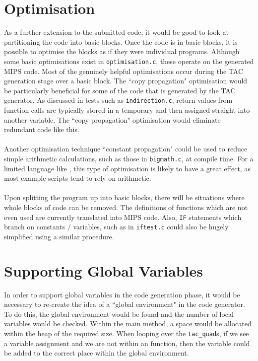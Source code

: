 \section{Optimisation}
As a further extension to the submitted code, it would be good to look at partitioning the code into basic blocks. Once the code is in basic blocks, it is possible to optimise the blocks as if they were individual programs. Although some basic optimisations exist in \verb!optimisation.c!, these operate on the generated MIPS code. Most of the genuinely helpful optimisations occur during the TAC generation stage over a basic block. The ``copy propagation" optimisation would be particularly beneficial for some of the code that is generated by the TAC generator. As discussed in tests such as \verb!indirection.c!, return values from function calls are typically stored in a temporary and then assigned straight into another variable. The ``copy propagation" optimisation would eliminate redundant code like this.
\ \\ \ \\
Another optimisation technique ``constant propagation" could be used to reduce simple arithmetic calculations, such as those in \verb!bigmath.c!, at compile time. For a limited language like \mmc, this type of optimisation is likely to have a great effect, as most example scripts tend to rely on arithmetic.
\ \\ \ \\
Upon splitting the program up into basic blocks, there will be situations where whole blocks of code can be removed. The definitions of functions which are not even used are currently translated into MIPS code. Also, \verb!IF! statements which branch on constants / variables, such as in \verb!iftest.c! could also be hugely simplified using a similar procedure.

\section{Supporting Global Variables}
In order to support global variables in the code generation phase, it would be necessary to re-create the idea of a ``global environment" in the code generator. To do this, the global environment would be found and the number of local variables would be checked. Within the main method, a space would be allocated within the heap of the required size. When looping over the \verb!tac_quad!s, if we see a variable assignment and we are not within an function, then the variable could be added to the correct place within the global environment.